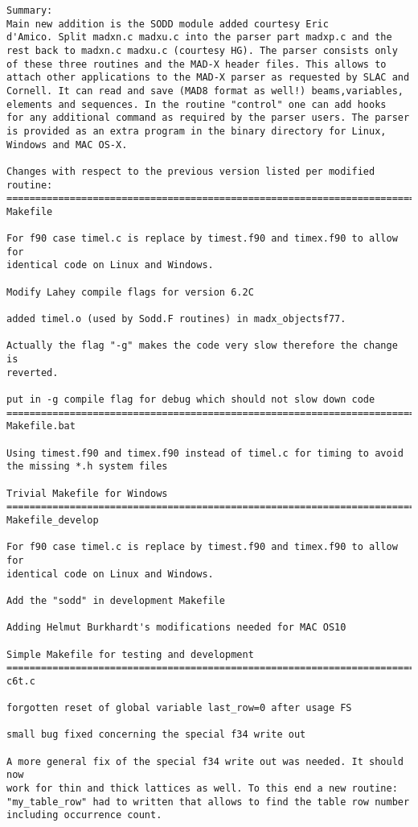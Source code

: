 \begin{verbatim}
Summary:
Main new addition is the SODD module added courtesy Eric
d'Amico. Split madxn.c madxu.c into the parser part madxp.c and the
rest back to madxn.c madxu.c (courtesy HG). The parser consists only
of these three routines and the MAD-X header files. This allows to
attach other applications to the MAD-X parser as requested by SLAC and
Cornell. It can read and save (MAD8 format as well!) beams,variables,
elements and sequences. In the routine "control" one can add hooks
for any additional command as required by the parser users. The parser
is provided as an extra program in the binary directory for Linux,
Windows and MAC OS-X.

Changes with respect to the previous version listed per modified routine:
=============================================================================
Makefile

For f90 case timel.c is replace by timest.f90 and timex.f90 to allow for
identical code on Linux and Windows.

Modify Lahey compile flags for version 6.2C

added timel.o (used by Sodd.F routines) in madx_objectsf77.

Actually the flag "-g" makes the code very slow therefore the change is
reverted.

put in -g compile flag for debug which should not slow down code
=============================================================================
Makefile.bat

Using timest.f90 and timex.f90 instead of timel.c for timing to avoid
the missing *.h system files

Trivial Makefile for Windows
=============================================================================
Makefile_develop

For f90 case timel.c is replace by timest.f90 and timex.f90 to allow for
identical code on Linux and Windows.

Add the "sodd" in development Makefile

Adding Helmut Burkhardt's modifications needed for MAC OS10

Simple Makefile for testing and development
=============================================================================
c6t.c

forgotten reset of global variable last_row=0 after usage FS

small bug fixed concerning the special f34 write out

A more general fix of the special f34 write out was needed. It should now
work for thin and thick lattices as well. To this end a new routine:
"my_table_row" had to written that allows to find the table row number
including occurrence count.


\end{verbatim}
